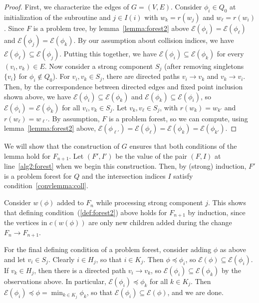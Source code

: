 \documentclass[11pt,reqno]{amsart}
\theoremstyle{definition}
\numberwithin{equation}{section}
\newcommand{\prf}{\begin{proof}}
\newcommand{\eprf}{\end{proof}}
\newcommand{\pre}{\phi}
\newcommand{\sub}{\subseteq}
\newcommand{\fix}{\mathcal{E}}
\newcommand{\peq}{\preceq}
\newcommand{\strongcomp}{S}
\newcommand{\acto}{Q_0}
\newcommand{\act}{Q}
\newcommand{\coll}{I}
\newcommand{\reach}{H}
\newcommand{\forest}{F}
\newcommand{\pair}{(F,I)}
\begin{document}
\begin{enumerate}
\prf
First, we characterize the edges of $G = (V,E)$. 
Consider $\pre_i \in \acto$ at initialization of the subroutine and $j \in \coll(i)$ with $w_k = r(w_j)$ and $w_{\ell} = r(w_i)$.
Since $\forest$ is a problem tree, by lemma~\ref{lemma:forest2} above $\fix(\pre_i) = \fix(\pre_{\ell})$ and $\fix(\pre_j) = \fix(\pre_k)$.
By our assumption about collision indices, we have $\fix(\pre_{\ell}) \sub \fix(\pre_j)$. 
Putting this together, we have $\fix(\pre_i) \sub \fix(\pre_k)$ for every $(v_i, v_k) \in E$.
Now consider a strong component $\strongcomp_j$ (after removing singletons $\{v_i\}$ for $\pre_i \not \in \acto$). 
For $v_i,v_k \in \strongcomp_j$, there are directed paths $v_i \to v_k$ and $v_k \to v_i$. 
Then, by the correspondence between directed edges and fixed point inclusion shown above, we have $\fix(\pre_i) \sub \fix(\pre_k)$ and $\fix(\pre_k) \sub \fix(\pre_i)$, so $\fix(\pre_i) = \fix(\pre_k)$ for all $v_i, v_k \in \strongcomp_j$. 
Let $v_k, v_{\ell} \in \strongcomp_j$, with $r(w_k) = w_{k'}$ and $r(w_{\ell}) = w_{\ell'}$.
By assumption,  $\forest$ is a problem forest, so we can compute, using lemma~\ref{lemma:forest2} above, $\fix(\pre_{\ell'}) = \fix(\pre_{\ell}) = \fix(\pre_k) = \fix(\pre_{k'})$. 

\eprf 


We will show that the construction of $G$ ensures that both conditions of the lemma hold for $\forest_{n + 1}$.
Let $(\forest',\coll')$ be the value of the pair $\pair$ at line~\ref{alg2:forest} when we begin this construction.
Then, by (strong) induction, $\forest'$ is a problem forest for $\act$ and the intersection indices $\coll$ satisfy condition~\ref{convlemma:coll}. 


Consider $w(\pre)$ added to $\forest_n$ while processing strong component $j$. 
This shows that defining condition~(\ref{def:forest2}) above holds for $\forest_{n + 1}$ by induction, since the vertices in $c(w(\pre))$ are only new children added during the change $\forest_n \to \forest_{n + 1}$.  

For the final defining condition of a problem forest, consider adding $\pre$ as above and let $v_i \in \strongcomp_j$. 
Clearly $i \in \reach_j$, so that $i \in K_j$. 
Then $\pre \peq \pre_i$, so $\fix(\pre) \sub \fix(\pre_i)$. 
If $v_k \in \reach_j$, then there is a directed path $v_i \to v_k$, so $\fix(\pre_i) \sub \fix(\pre_k)$ by the observations above. 
In particular, $\fix(\pre_i) \peq \pre_k$ for all $k \in K_j$. 
Then $\fix(\pre_i) \peq \pre = \min_{k \in K_j} \pre_k$, so that $\fix(\pre_i) \sub \fix(\pre)$, and we are done. 


\end{enumerate}
\end{document}
